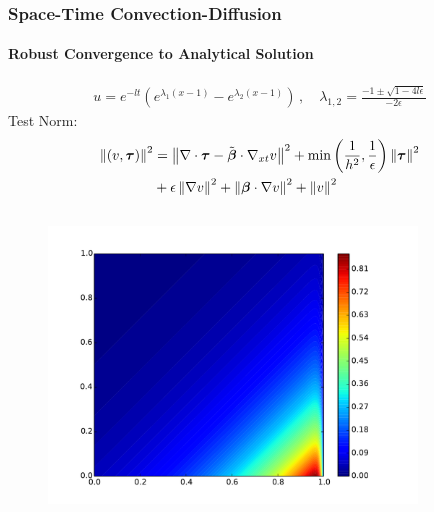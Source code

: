 \documentclass[18pt,xcolor=table]{beamer}
\begin{document}
\begin{frame}[t]
\frametitle{Space-Time Convection-Diffusion}
\framesubtitle{Robust Convergence to Analytical Solution}
\vspace{-4ex}
\small{
\begin{align*}
u=e^{-lt}(e^{\lambda_1(x-1)}-e^{\lambda_2(x-1)})\,,\quad
\lambda_{1,2}=\frac{-1\pm\sqrt{1-4l\epsilon}}{-2\epsilon}
\end{align*}
}
Test Norm:
\small{
\begin{align*}
\left\| (v,\boldsymbol\tau) \right\|^2&=
\left\| \nabla\cdot\boldsymbol\tau-\tilde{\boldsymbol\beta}\cdot\nabla_{xt} v \right\|^2
+\min\left( \frac{1}{h^2},\frac{1}{\epsilon} \right)\left\| \boldsymbol\tau \right\|^2\\
&+\epsilon\left\| \nabla v \right\|^2
+\left\| \boldsymbol\beta\cdot\nabla v \right\|^2
+\left\| v \right\|^2
\end{align*}
}
\vspace{-4ex}
\begin{columns}[t]
\begin{column}{0.5\textwidth}
\vspace{-4ex}
\begin{figure}[t]
\centering
\includegraphics[width=\textwidth]{SpaceTimeAnalyticalExact}
\end{figure}
\end{column}
\begin{column}{0.5\textwidth}
\vspace{-4ex}
\begin{figure}[t]
\centering

\end{figure}
\end{column}
\end{columns}
\end{frame}
\end{document}
